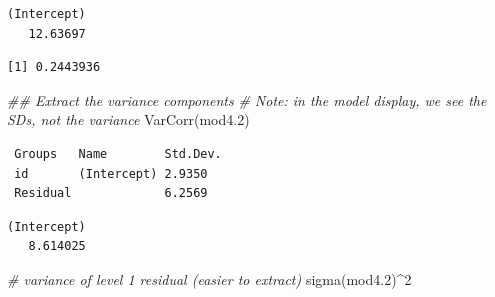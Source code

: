 \documentclass[
  letterpaper,
  DIV=11,
  numbers=noendperiod]{scrreprt}
\newenvironment{Shaded}{\begin{snugshade}}{\end{snugshade}}
\newcommand{\CommentTok}[1]{\textcolor[rgb]{0.38,0.63,0.69}{\textit{#1}}}
\newcommand{\DecValTok}[1]{\textcolor[rgb]{0.25,0.63,0.44}{#1}}
\newcommand{\DocumentationTok}[1]{\textcolor[rgb]{0.73,0.13,0.13}{\textit{#1}}}
\newcommand{\FloatTok}[1]{\textcolor[rgb]{0.25,0.63,0.44}{#1}}
\newcommand{\FunctionTok}[1]{\textcolor[rgb]{0.02,0.16,0.49}{#1}}
\newcommand{\NormalTok}[1]{\textcolor[rgb]{0.00,0.44,0.13}{#1}}
\newcommand{\SpecialCharTok}[1]{\textcolor[rgb]{0.25,0.44,0.63}{#1}}
\begin{document}
\begin{verbatim}
(Intercept) 
   12.63697 
\end{verbatim}

\begin{Shaded}
\end{Shaded}

\begin{verbatim}
[1] 0.2443936
\end{verbatim}

\begin{Shaded}
\begin{Highlighting}[]
\DocumentationTok{\#\# Extract the variance components}
\CommentTok{\# Note: in the model display, we see the SDs, not the variance}
\FunctionTok{VarCorr}\NormalTok{(mod4}\FloatTok{.2}\NormalTok{)}
\end{Highlighting}
\end{Shaded}

\begin{verbatim}
 Groups   Name        Std.Dev.
 id       (Intercept) 2.9350  
 Residual             6.2569  
\end{verbatim}

\begin{Shaded}
\end{Shaded}

\begin{verbatim}
(Intercept) 
   8.614025 
\end{verbatim}

\begin{Shaded}
\begin{Highlighting}[]
\CommentTok{\# variance of level 1 residual (easier to extract)}
\FunctionTok{sigma}\NormalTok{(mod4}\FloatTok{.2}\NormalTok{)}\SpecialCharTok{\^{}}\DecValTok{2} 
\end{Highlighting}
\end{Shaded}
\end{document}
